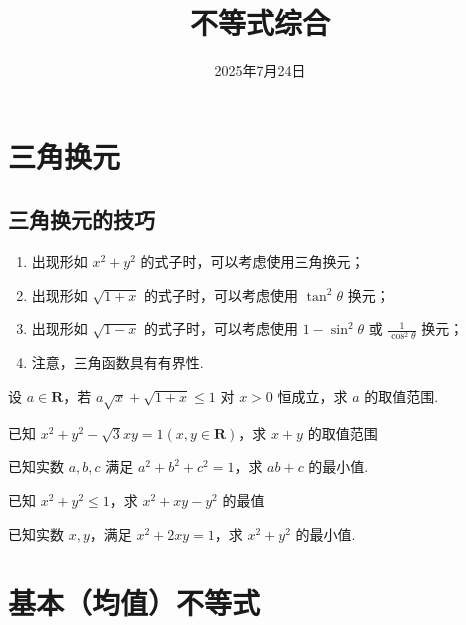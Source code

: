 \documentclass[a4paper , final]{ctexart}
\title{不等式综合}
\date{2025年7月24日}
\newenvironment{problem}[1]{%
  \item #1
  \par
  \vspace{8cm}
}{}
\begin{document}
\maketitle

\section*{三角换元}

\subsection*{三角换元的技巧}
\begin{enumerate}
  \item 出现形如 $x^2+y^2$ 的式子时，可以考虑使用三角换元；
  \item 出现形如 $\sqrt{1+x}$ 的式子时，可以考虑使用 $\tan^2\theta$ 换元；
  \item 出现形如 $\sqrt{1-x}$ 的式子时，可以考虑使用 $1-\sin^2\theta$ 或 $\frac{1}{\cos^2\theta}$ 换元；
  \item  注意，三角函数具有有界性.
\end{enumerate}

\begin{problems}
  \begin{problem}
    {
      设 $a\in\mathbf{R}$，若 $a\sqrt{x}+\sqrt{1+x}\leq 1$ 对 $x>0$ 恒成立，求 $a$ 的取值范围.
    }
  \end{problem}

  \begin{problem}
    {
      已知 $x^2+y^2-\sqrt{3}xy = 1(x,y\in\mathbf{R})$，求 $x+y$ 的取值范围
    }
  \end{problem}
\newpage
  \begin{problem}
    {
      已知实数 $a,b,c$ 满足 $a^2+b^2+c^2=1$，求 $ab+c$ 的最小值.
    }
  \end{problem}

  \begin{problem}
    {
      已知 $x^2+y^2\leq 1$，求 $x^2+xy-y^2$ 的最值
    }
  \end{problem}

  \begin{problem}
    {
      已知实数 $x,y$，满足 $x^2+2xy=1$，求 $x^2+y^2$ 的最小值.
    }
  \end{problem}
\end{problems}

\section*{基本（均值）不等式}
\end{document}
